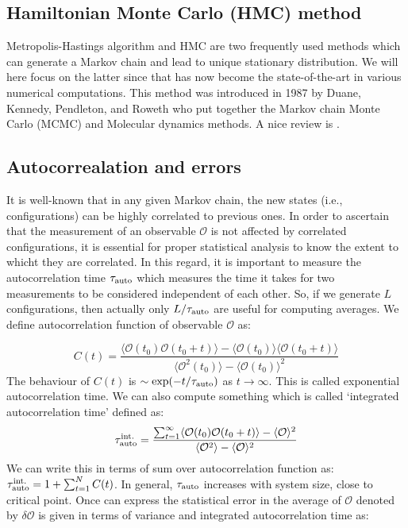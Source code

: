 \documentclass[11pt]{article}
\begin{document}
\subsection{Hamiltonian Monte Carlo (HMC) method}
Metropolis-Hastings algorithm and HMC are two frequently used methods which can generate a Markov chain and lead to unique stationary distribution. We will here focus on the latter since that has now become the state-of-the-art in various numerical computations. 
This method was introduced in 1987 by Duane, Kennedy, Pendleton, and Roweth who put together the Markov chain Monte Carlo (MCMC) and Molecular dynamics methods. A nice review is \cite{Hanada:2018fnp}. 

\subsection{Autocorrealation and errors} 

It is well-known that in any given Markov chain, the new states (i.e., configurations) can be highly correlated to previous ones. In order to ascertain that the measurement of an observable $\mathcal{O}$ is not affected by correlated configurations, it is essential for proper statistical analysis to know the extent to whicht they are
correlated. In this regard, it is important to measure
the autocorrelation time $ \tau_{\rm{auto}}$ which measures the time it takes for two measurements to be considered independent of each other. So, if we generate $L$ configurations, then actually only $L/\tau_{\rm{auto}}$ are useful for computing averages.
We define autocorrelation function of observable $\mathcal{O}$ as:
 
 \begin{equation}
 	C(t) = \frac{\langle \mathcal{O}(t_0) \mathcal{O}(t_0 + t) \rangle - \langle \mathcal{O}(t_0)\rangle \langle \mathcal{O}(t_0 + t) \rangle}{\langle \mathcal{O}^2(t_0)\rangle - \langle \mathcal{O}(t_0)\rangle^{2}}
 \end{equation}
The behaviour of $C(t)$ is $\sim \exp(-t/\tau_{\rm{auto}})$ as $ t \to \infty$. This is called exponential autocorrelation time. We can also compute something which is called `integrated autocorrelation time' defined as:
\begin{equation}
	\tau_{\rm{auto}}^{\rm{int.}} = \frac{\sum_{t=1}^{\infty} \langle \mathcal{O}(t_0) \mathcal{O}(t_0 + t) \rangle - \langle \mathcal{O} \rangle^2 }{\langle \mathcal{O}^2\rangle - \langle \mathcal{O}\rangle^{2}}
\end{equation}
We can write this in terms of sum over autocorrelation function as: $\tau_{\rm{auto}}^{\rm{int.}} = 1 + \sum_{t=1}^{N} C(t)$. In general, $ \tau_{\rm{auto}}$ increases with system size, close to critical point. Once can express the statistical error in the average of $\mathcal{O}$ denoted by $\delta \mathcal{O}$ is given in terms of variance and integrated autocorrelation time as:
\end{document}
